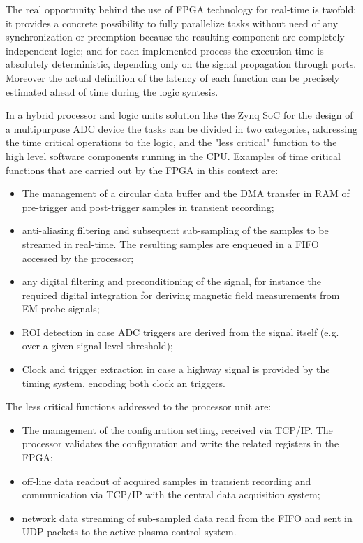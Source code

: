 The real opportunity behind the use of FPGA technology for real-time is twofold: it provides a concrete possibility to fully parallelize tasks without need of any synchronization or preemption because the resulting component are completely independent logic; and for each implemented process the execution time is absolutely deterministic, depending only on the signal propagation through ports. Moreover the actual definition of the latency of each function can be precisely estimated ahead of time during the logic syntesis. 

In a hybrid processor and logic units solution like the Zynq SoC for the design of a multipurpose ADC device the tasks can be divided in two categories, addressing the time critical operations to the logic, and the "less critical" function to the high level software components running in the CPU.
Examples of time critical functions that are carried out by the FPGA in this context are:
\begin{itemize}
\item The management of a circular data buffer and the DMA transfer in RAM of pre-trigger and post-trigger samples in transient recording;
\item anti-aliasing filtering and subsequent sub-sampling of the samples to be streamed in real-time. The resulting samples are enqueued in a FIFO accessed by the processor;
\item any digital filtering and preconditioning of the signal, for instance the required digital integration for deriving magnetic field measurements from EM probe signals;
\item ROI detection in case ADC triggers are derived from the signal itself (e.g. over a given signal level threshold);
\item Clock and trigger extraction in case a highway signal is provided by the timing system, encoding both clock an triggers.
\end{itemize}
%
The less critical functions addressed to the processor unit are:
\begin{itemize}
\item The management of the configuration setting, received via TCP/IP. The processor validates the configuration and write the related registers in the FPGA;
\item off-line data readout of acquired samples in transient recording and communication via TCP/IP with the central data acquisition system;
\item network data streaming of sub-sampled data read from the FIFO and sent in UDP packets to the active plasma control system. 
\end{itemize}

